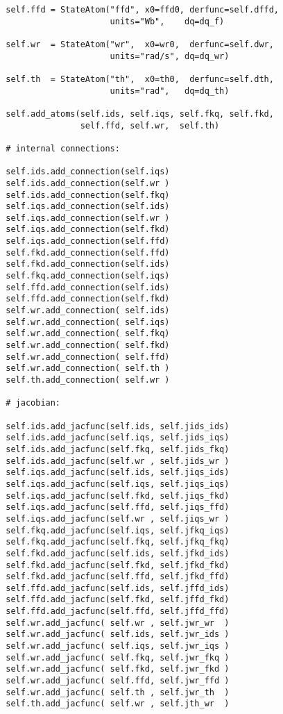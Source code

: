 \begin{lstlisting}
        self.ffd = StateAtom("ffd", x0=ffd0, derfunc=self.dffd,
                             units="Wb",    dq=dq_f)
                             
        self.wr  = StateAtom("wr",  x0=wr0,  derfunc=self.dwr,
                             units="rad/s", dq=dq_wr)
                             
        self.th  = StateAtom("th",  x0=th0,  derfunc=self.dth, 
                             units="rad",   dq=dq_th)
        
        self.add_atoms(self.ids, self.iqs, self.fkq, self.fkd,
                       self.ffd, self.wr,  self.th)
        
        # internal connections:
        
        self.ids.add_connection(self.iqs)
        self.ids.add_connection(self.wr )
        self.ids.add_connection(self.fkq)   
        self.iqs.add_connection(self.ids)
        self.iqs.add_connection(self.wr )
        self.iqs.add_connection(self.fkd)
        self.iqs.add_connection(self.ffd)      
        self.fkd.add_connection(self.ffd)
        self.fkd.add_connection(self.ids)
        self.fkq.add_connection(self.iqs)       
        self.ffd.add_connection(self.ids)
        self.ffd.add_connection(self.fkd)      
        self.wr.add_connection( self.ids)
        self.wr.add_connection( self.iqs)
        self.wr.add_connection( self.fkq)
        self.wr.add_connection( self.fkd)
        self.wr.add_connection( self.ffd)
        self.wr.add_connection( self.th )
        self.th.add_connection( self.wr )
        
        # jacobian:
        
        self.ids.add_jacfunc(self.ids, self.jids_ids)
        self.ids.add_jacfunc(self.iqs, self.jids_iqs)
        self.ids.add_jacfunc(self.fkq, self.jids_fkq)
        self.ids.add_jacfunc(self.wr , self.jids_wr )    
        self.iqs.add_jacfunc(self.ids, self.jiqs_ids)
        self.iqs.add_jacfunc(self.iqs, self.jiqs_iqs)
        self.iqs.add_jacfunc(self.fkd, self.jiqs_fkd)
        self.iqs.add_jacfunc(self.ffd, self.jiqs_ffd)
        self.iqs.add_jacfunc(self.wr , self.jiqs_wr )       
        self.fkq.add_jacfunc(self.iqs, self.jfkq_iqs)
        self.fkq.add_jacfunc(self.fkq, self.jfkq_fkq)     
        self.fkd.add_jacfunc(self.ids, self.jfkd_ids)
        self.fkd.add_jacfunc(self.fkd, self.jfkd_fkd)
        self.fkd.add_jacfunc(self.ffd, self.jfkd_ffd)    
        self.ffd.add_jacfunc(self.ids, self.jffd_ids)
        self.ffd.add_jacfunc(self.fkd, self.jffd_fkd)
        self.ffd.add_jacfunc(self.ffd, self.jffd_ffd)        
        self.wr.add_jacfunc( self.wr , self.jwr_wr  )
        self.wr.add_jacfunc( self.ids, self.jwr_ids )
        self.wr.add_jacfunc( self.iqs, self.jwr_iqs )
        self.wr.add_jacfunc( self.fkq, self.jwr_fkq )
        self.wr.add_jacfunc( self.fkd, self.jwr_fkd )
        self.wr.add_jacfunc( self.ffd, self.jwr_ffd )
        self.wr.add_jacfunc( self.th , self.jwr_th  )       
        self.th.add_jacfunc( self.wr , self.jth_wr  )
        

\end{lstlisting}

